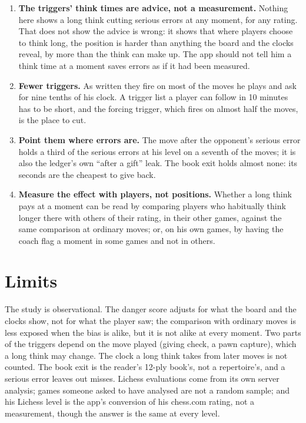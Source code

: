 \documentclass[11pt]{article}
\begin{document}
\begin{enumerate}[nosep]
\item \textbf{The triggers' think times are advice, not a measurement.} Nothing here shows a long
think cutting serious errors at any moment, for any rating. That does not show the advice is wrong:
it shows that where players choose to think long, the position is harder than anything the board
and the clocks reveal, by more than the think can make up. The app should not tell him a think
time at a moment saves errors as if it had been measured.
\item \textbf{Fewer triggers.} As written they fire on most of the moves he plays and ask for
nine tenths of his clock. A trigger list a player can follow in 10 minutes has to be short, and
the forcing trigger, which fires on almost half the moves, is the place to cut.
\item \textbf{Point them where errors are.} The move after the opponent's serious error holds a
third of the serious errors at his level on a seventh of the moves; it is also the ledger's own
``after a gift'' leak. The book exit holds almost none: its \BookEnd{} seconds are the cheapest to
give back.
\item \textbf{Measure the effect with players, not positions.} Whether a long think pays at a
moment can be read by comparing players who habitually think longer there with others of their
rating, in their other games, against the same comparison at ordinary moves; or, on his own games,
by having the coach flag a moment in some games and not in others.
\end{enumerate}

\section{Limits}

The study is observational. The danger score adjusts for what the board and the clocks show, not
for what the player saw; the comparison with ordinary moves is less exposed when the bias is alike,
but it is not alike at every moment. Two parts of the triggers depend on the move played (giving
check, a pawn capture), which a long think may change. The clock a long think takes from later
moves is not counted. The book exit is the reader's 12-ply book's, not a repertoire's, and a serious
error leaves out misses. Lichess evaluations come from its own server analysis; games someone asked
to have analysed are not a random sample; and his Lichess level is the app's conversion of his
chess.com rating, not a measurement, though the answer is the same at every level.
\end{document}
